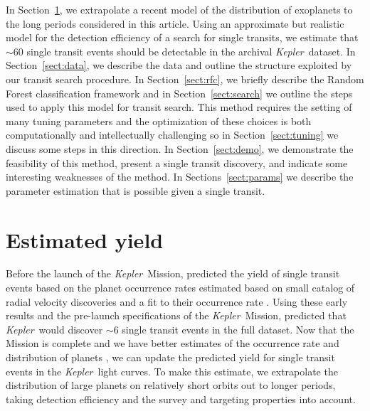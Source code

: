 \documentclass[12pt,preprint]{aastex}
\newcommand{\project}[1]{\textsl{#1}}
\newcommand{\kepler}{\project{Kepler}}
\newcommand{\paper}{article}
\newcommand{\sectionname}{Section}
\newcommand{\sectref}[1]{\ref{sect:#1}}
\newcommand{\Sect}[1]{\sectionname~\sectref{#1}}
\newcommand{\sect}[1]{\Sect{#1}}
\newcommand{\sectlabel}[1]{\label{sect:#1}}
\begin{document}
In \sect{est}, we extrapolate a recent model of the distribution of exoplanets
to the long periods considered in this \paper.
Using an approximate but realistic model for the detection efficiency of a
search for single transits, we estimate that $\sim 60$ single transit events
should be detectable in the archival \kepler\ dataset.
In \sect{data}, we describe the data and outline the structure exploited by
our transit search procedure.
In \sect{rfc}, we briefly describe the Random Forest classification framework
and in \sect{search} we outline the steps used to apply this model for transit
search.
This method requires the setting of many tuning parameters and the
optimization of these choices is both computationally and intellectually
challenging so in \sect{tuning} we discuss some steps in this direction.
In \sect{demo}, we demonstrate the feasibility of this method, present a
single transit discovery, and indicate some interesting weaknesses of the
method.
In \sectionname s~\sectref{params} we describe the parameter estimation that
is possible given a single transit.



\section{Estimated yield}\sectlabel{est}

Before the launch of the \kepler\ Mission, \citet{Yee:2008} predicted the
yield of single transit events based on the planet occurrence rates estimated
based on small catalog of radial velocity discoveries \citep{Butler:2006} and
a fit to their occurrence rate \citep{Cumming:2008}.
Using these early results and the pre-launch specifications of the \kepler\
Mission, \citet{Yee:2008} predicted that \kepler\ would discover $\sim 6$
single transit events in the full dataset.
Now that the Mission is complete and we have better estimates of the
occurrence rate and distribution of planets \citep[for example][]{Dong:2013,
Petigura:2013, Foreman-Mackey:2014, Dressing:2015}, we can update the
predicted yield for single transit events in the \kepler\ light curves.
To make this estimate, we extrapolate the distribution of large planets on
relatively short orbits out to longer periods, taking detection efficiency
and the survey and targeting properties into account.
\end{document}

